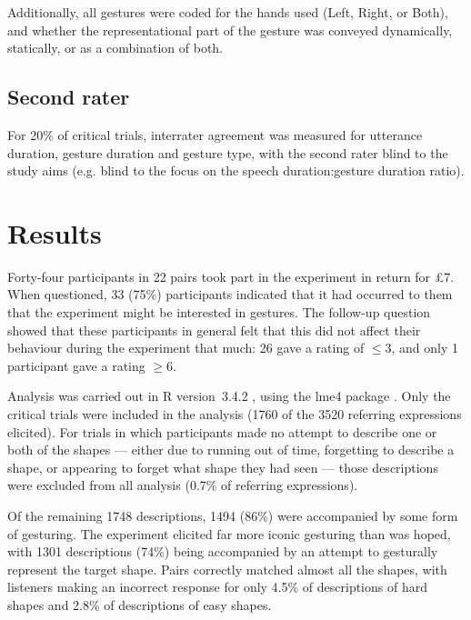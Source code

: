 \documentclass[a4paper,man,natbib]{apa6}
\begin{document}
Additionally, all gestures were coded for the hands used (Left, Right, or Both), and whether the representational part of the gesture was conveyed dynamically, statically, or as a combination of both. 

\subsection{Second rater}
For 20\% of critical trials, interrater agreement was measured for utterance duration, gesture duration and gesture type, with the second rater blind to the study aims (e.g. blind to the focus on the speech duration:gesture duration ratio).


\section{Results}
Forty-four participants in 22 pairs took part in the experiment in return for \pounds{7}.
When questioned, 33 (75\%) participants indicated that it had occurred to them that the experiment might be interested in gestures.
The follow-up question showed that these participants in general felt that this did not affect their behaviour during the experiment that much: 26 gave a rating of $\leq$3, and only 1 participant gave a rating $\geq$6. 

Analysis was carried out in R version~3.4.2 \citep{rbase}, using the lme4 package \citep{lme4}.
Only the critical trials were included in the analysis (1760 of the 3520 referring expressions elicited).
For trials in which participants made no attempt to describe one or both of the shapes --- either due to running out of time, forgetting to describe a shape, or appearing to forget what shape they had seen --- those descriptions were excluded from all analysis (0.7\% of referring expressions).

Of the remaining 1748 descriptions, 1494 (86\%) were accompanied by some form of gesturing. 
The experiment elicited far more iconic gesturing than was hoped, with 1301 descriptions (74\%) being accompanied by an attempt to gesturally represent the target shape.
Pairs correctly matched almost all the shapes, with listeners making an incorrect response for only 4.5\% of descriptions of hard shapes and 2.8\% of descriptions of easy shapes.
\end{document}
